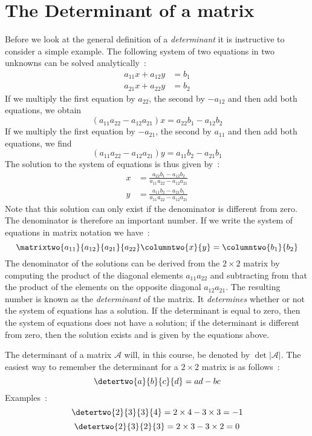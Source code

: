 \section{The Determinant of a matrix}

Before we look at the general definition of a \textit{determinant} it is instructive to consider a simple example.
The following system of two equations in two unknowns can be solved analytically~:
\begin{align}
a_{11}x+a_{12}y&=b_1\nonumber\\
a_{21}x+a_{22}y&=b_2\nonumber
\end{align}
If we multiply the first equation by $a_{22}$, the second by $-a_{12}$ and then add both equations, we obtain
\[
(a_{11}a_{22}-a_{12}a_{21})x=a_{22}b_1-a_{12}b_2
\]
If we multiply the first equation by $-a_{21}$, the second by $a_{11}$ and then add both equations, we find
\[
(a_{11}a_{22}-a_{12}a_{21})y=a_{11}b_2-a_{21}b_1
\]
The solution to the system of equations is thus given by~:
\begin{align}
x&=\frac{a_{22}b_1-a_{12}b_2}{a_{11}a_{22}-a_{12}a_{21}}\nonumber\\
y&=\frac{a_{11}b_2-a_{21}b_1}{a_{11}a_{22}-a_{12}a_{21}}\nonumber
\end{align}
Note that this solution can only exist if the denominator is different from zero.  The denominator is therefore
an important number.  If we write the system of equations in matrix notation we have~:
\[
\matrixtwo{a_{11}}{a_{12}}{a_{21}}{a_{22}}\columntwo{x}{y}=\columntwo{b_1}{b_2}
\]
The denominator of the solutions can be derived from the $2\times 2$ matrix by computing the product of the diagonal
elements $a_{11}a_{22}$ and subtracting from that the product of the elements on the opposite diagonal $a_{12}a_{21}$.
The resulting number is known as the \textit{determinant} of the matrix.  It \textit{determines} whether or not the system
of equations has a solution.  If the determinant is equal to zero, then the system of equations does not have a solution;  if
the determinant is different from zero, then the solution exists and is given by the equations above.

The determinant of a matrix $\mathcal{A}$ will, in this course, be denoted by $\det\vert\mathcal{A}\vert$.  The easiest way to
remember the determinant for a $2\times 2$ matrix is as follows~:  
\begin{equation}
\detertwo{a}{b}{c}{d}=ad-bc
\end{equation}
Examples~:
\[
\detertwo{2}{3}{3}{4}=2\times 4-3\times 3=-1
\]
\[
\detertwo{2}{3}{2}{3}=2\times 3-3\times 2=0
\]

